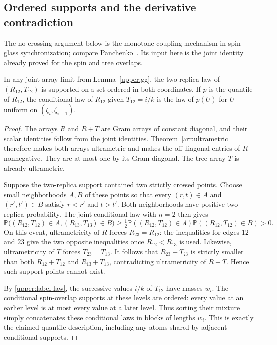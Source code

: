 \subsection{Ordered supports and the derivative contradiction}

The no-crossing argument below is the monotone-coupling mechanism in
spin-glass synchronization; compare Panchenko~\cite[Section~4, Lemma~2]{panchenko2015multispecies}.
Its input here is the joint identity already proved for the spin and tree
overlaps.

\begin{lemma}
\label{upper:synchronization}
In any joint array limit from Lemma~\ref{upper:gg}, the
two-replica law of $(R_{12},T_{12})$ is supported on a set
ordered in both coordinates. If $p$ is the quantile of
$R_{12}$, the conditional law of $R_{12}$ given $T_{12}=i/k$
is the law of $p(U)$ for $U$ uniform on
$(\zeta_i,\zeta_{i+1})$.
\end{lemma}

\begin{proof}
The arrays $R$ and $R+T$ are Gram arrays of constant diagonal,
and their scalar identities follow from the joint identities.
Theorem~\ref{arr:ultrametric} therefore makes both arrays
ultrametric and makes the off-diagonal entries of $R$
nonnegative. They are at most one by its Gram diagonal.
The tree array $T$ is already ultrametric.

Suppose the two-replica support contained two strictly crossed
points. Choose small neighborhoods $A,B$ of these points so
that every $(r,t)\in A$ and $(r',t')\in B$ satisfy
$r<r'$ and $t>t'$. Both neighborhoods have positive
two-replica probability. The joint conditional law with
$n=2$ then gives
\[
 \mathbb P\big((R_{12},T_{12})\in A,
               (R_{13},T_{13})\in B\big)
 \ge\tfrac12\mathbb P((R_{12},T_{12})\in A)
              \mathbb P((R_{12},T_{12})\in B)>0.
\]
On this event, ultrametricity of $R$ forces $R_{23}=R_{12}$:
the inequalities for edges $12$ and $23$ give the two opposite
inequalities once $R_{12}<R_{13}$ is used. Likewise,
ultrametricity of $T$ forces $T_{23}=T_{13}$.
It follows that $R_{23}+T_{23}$ is strictly smaller than both
$R_{12}+T_{12}$ and $R_{13}+T_{13}$, contradicting
ultrametricity of $R+T$. Hence such support points cannot
exist.

By \eqref{upper:label-law}, the successive values $i/k$ of
$T_{12}$ have masses $w_i$. The conditional spin-overlap
supports at these levels are ordered: every value at an
earlier level is at most every value at a later level.
Thus sorting their mixture simply concatenates these
conditional laws in blocks of lengths $w_i$. This is exactly
the claimed quantile description, including any atoms shared
by adjacent conditional supports.
\end{proof}

